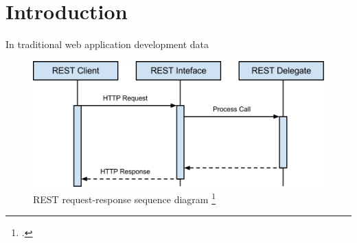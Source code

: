 

\title{\papertitle}
\author{Rocco Schulz, Max V\"{o}kler, Joe Boden,\\ Robert Wawrzyniak, Can Paul Bineytioglu\\\\
	Corporate State University\\Baden-Wuerttemberg - Stuttgart}

\date{\today}



\maketitle

\begin{abstract}
This paper evaluates asynchronous server technologies. Strenghts and weaknesses
of asynchronous programming models are elaborated and a proof of concept 
based on node.js and vert.x is used to evaluate non-functional attributes such as
maintainability. \ldots
\end{abstract}
\newpage

\tableofcontents
\newpage

\printnomenclature
{}
\newpage

\section{Introduction}

In traditional web application development data 

\begin{figure}[hbtp]
\centering
\includegraphics[scale=0.75]{img/image01.png}
\caption{REST request-response sequence diagram \footcite{req_res}\label{img_req_res}}
\end{figure}


